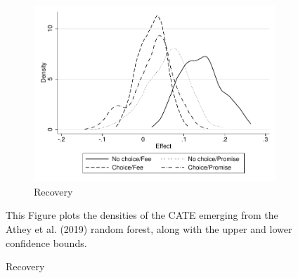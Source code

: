 \begin{figure}[H]
\begin{center}
\begin{subfigure}{0.45\textwidth}
    \end{subfigure}  
     \begin{subfigure}{0.45\textwidth}
    \caption{Recovery}
       \centering
      \includegraphics[width=\textwidth]{Figuras/he_dist_des_c.pdf}
    \end{subfigure}      
    \end{center}
         \scriptsize
     This Figure plots the densities of the CATE emerging from the Athey et al. (2019) random forest, along with the upper and lower confidence bounds.  
\end{figure}





